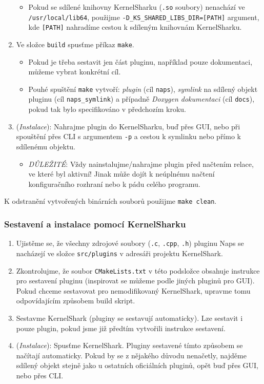 \begin{enumerate}
\begin{itemize}
      \item Pokud se sdílené knihovny KernelSharku (\texttt{.so} soubory) nenachází ve \texttt{/usr/local/lib64}, použijme \texttt{-D\_KS\_SHARED\_LIBS\_DIR=[PATH]} argument, kde \texttt{[PATH]} nahradíme cestou k sdíleným knihovnám KernelSharku.
    \end{itemize}
  \item Ve složce \texttt{build} spusťme příkaz \texttt{make}.
    \begin{itemize}
      \item Pokud je třeba sestavit jen část pluginu, například pouze dokumentaci, můžeme vybrat konkrétní cíl.
      \item Pouhé spuštění \texttt{make} vytvoří: \emph{plugin} (cíl \texttt{naps}), \emph{symlink} na sdílený objekt pluginu (cíl \texttt{naps\_symlink}) a případně \emph{Doxygen dokumentaci} (cíl \texttt{docs}), pokud tak bylo specifikováno v předchozím kroku.
    \end{itemize}
  \item (\emph{Instalace}): Nahrajme plugin do KernelSharku, buď přes GUI, nebo při spouštění přes CLI s argumentem \texttt{-p} a cestou k symlinku nebo přímo k sdílenému objektu.
    \begin{itemize}
      \item \emph{DŮLEŽITÉ}: Vždy nainstalujme/nahrajme plugin před načtením relace, ve které byl aktivní! Jinak může dojít k neúplnému načtení konfiguračního rozhraní nebo k pádu celého programu.
    \end{itemize}
\end{enumerate}

K odstranění vytvořených binárních souborů použijme \texttt{make clean}.

\subsubsection{Sestavení a instalace pomocí KernelSharku}

\begin{enumerate}
  \item Ujistěme se, že všechny zdrojové soubory (\texttt{.c}, \texttt{.cpp}, \texttt{.h}) pluginu Naps se nacházejí ve složce \texttt{src/plugins} v adresáři projektu KernelShark.
  \item Zkontrolujme, že soubor \texttt{CMakeLists.txt} v této podsložce obsahuje instrukce pro sestavení pluginu (inspirovat se můžeme podle jiných pluginů pro GUI). Pokud chceme sestavovat pro nemodifikovaný KernelShark, upravme tomu odpovídajícím způsobem build skript.
  \item Sestavme KernelShark (pluginy se sestavují automaticky). Lze sestavit i pouze plugin, pokud jsme již předtím vytvořili instrukce sestavení.
  \item (\emph{Instalace}): Spusťme KernelShark. Pluginy sestavené tímto způsobem se načítají automaticky. Pokud by se z nějakého důvodu nenačetly, najděme sdílený objekt stejně jako u ostatních oficiálních pluginů, opět buď přes GUI, nebo přes CLI.
\end{enumerate}


